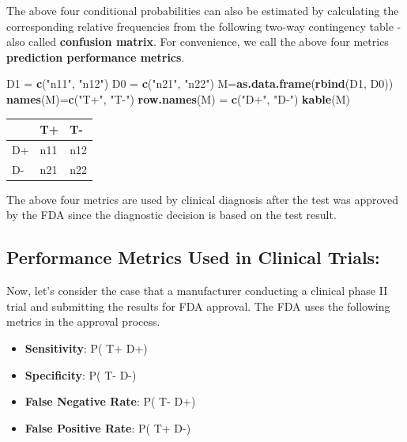 \documentclass[
]{book}
\newenvironment{Shaded}{\begin{snugshade}}{\end{snugshade}}
\newcommand{\FunctionTok}[1]{\textcolor[rgb]{0.13,0.29,0.53}{\textbf{#1}}}
\newcommand{\NormalTok}[1]{#1}
\newcommand{\OtherTok}[1]{\textcolor[rgb]{0.56,0.35,0.01}{#1}}
\newcommand{\StringTok}[1]{\textcolor[rgb]{0.31,0.60,0.02}{#1}}
\begin{document}
The above four conditional probabilities can also be estimated by calculating the corresponding relative frequencies from the following two-way contingency table - also called \textbf{confusion matrix}. For convenience, we call the above four metrics \textbf{prediction performance metrics}.

\begin{Shaded}
\begin{Highlighting}[]
\NormalTok{D1 }\OtherTok{=} \FunctionTok{c}\NormalTok{(}\StringTok{"n11"}\NormalTok{, }\StringTok{"n12"}\NormalTok{)}
\NormalTok{D0 }\OtherTok{=} \FunctionTok{c}\NormalTok{(}\StringTok{"n21"}\NormalTok{, }\StringTok{"n22"}\NormalTok{)}
\NormalTok{M}\OtherTok{=}\FunctionTok{as.data.frame}\NormalTok{(}\FunctionTok{rbind}\NormalTok{(D1, D0))}
\FunctionTok{names}\NormalTok{(M)}\OtherTok{=}\FunctionTok{c}\NormalTok{(}\StringTok{"T+"}\NormalTok{, }\StringTok{"T{-}"}\NormalTok{)}
\FunctionTok{row.names}\NormalTok{(M) }\OtherTok{=} \FunctionTok{c}\NormalTok{(}\StringTok{"D+"}\NormalTok{, }\StringTok{"D{-}"}\NormalTok{)}
\FunctionTok{kable}\NormalTok{(M)}
\end{Highlighting}
\end{Shaded}

\begin{tabular}{l|l|l}
\hline
  & T+ & T-\\
\hline
D+ & n11 & n12\\
\hline
D- & n21 & n22\\
\hline
\end{tabular}

The above four metrics are used by clinical diagnosis after the test was approved by the FDA since the diagnostic decision is based on the test result.

\hypertarget{performance-metrics-used-in-clinical-trials}{%
\subsection{Performance Metrics Used in Clinical Trials:}\label{performance-metrics-used-in-clinical-trials}}

Now, let's consider the case that a manufacturer conducting a clinical phase II trial and submitting the results for FDA approval. The FDA uses the following metrics in the approval process.

\begin{itemize}
\item
  \textbf{Sensitivity}: P( T+ \textbar{} D+)
\item
  \textbf{Specificity}: P( T- \textbar{} D-)
\item
  \textbf{False Negative Rate}: P( T- \textbar{} D+)
\item
  \textbf{False Positive Rate}: P( T+ \textbar{} D-)
\end{itemize}
\end{document}
